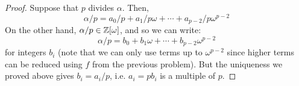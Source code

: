 \begin{proof}
    Suppose that $p$ divides $\alpha$. Then,
    \[ \alpha/p = a_0/p + a_1/p\omega + \cdots + a_{p-2}/p\omega^{p-2} \]
    On the other hand, $\alpha/p \in \mathbb{Z}[\omega]$, and so we can write:
    \[ \alpha/p = b_0 + b_1\omega + \cdots + b_{p-2}\omega^{p-2} \]
    for integers $b_i$ (note that we can only use terms up to $\omega^{p-2}$ since higher terms can be reduced using $f$ from the previous problem). But the uniqueness we proved above gives $b_i = a_i/p$, i.e. $a_i = pb_i$ is a multiple of $p$.
\end{proof}